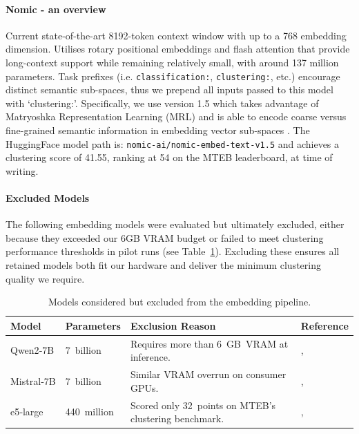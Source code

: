 \documentclass[10pt,oneside]{report}
\renewcommand{\citet}[1]{\citeauthor{#1}, \citeyear{#1}}
\begin{document}
\paragraph{Nomic - an overview}
Current state-of-the-art 8192-token context window with up to a 768 embedding dimension. Utilises rotary positional embeddings and flash attention that provide long-context support while remaining relatively small, with around 137 million parameters. Task prefixes (i.e. \texttt{classification:}, \texttt{clustering:}, etc.) encourage distinct semantic sub-spaces, thus we prepend all inputs passed to this model with `clustering:'. Specifically, we use version 1.5 which takes advantage of Matryoshka Representation Learning (MRL) and is able to encode coarse versus fine-grained semantic information in embedding vector sub-spaces \cite{nussbaum2024nomic, nussbaum2024nomic1.5}. The HuggingFace model path is: \texttt{nomic-ai/nomic-embed-text-v1.5} and achieves a clustering score of 41.55, ranking at 54 on the MTEB leaderboard, at time of writing.

\paragraph{Excluded Models}
The following embedding models were evaluated but ultimately excluded, either because they exceeded our 6GB VRAM budget or failed to meet clustering performance thresholds in pilot runs (see Table~\ref{tab:excludedModels}). Excluding these ensures all retained models both fit our hardware and deliver the minimum clustering quality we require.

\begin{table}[htbp]
    \fontsize{8}{11}\selectfont
    \centering
    \begin{adjustbox}{max width=\textwidth}
        \begin{tabular}{p{1.6cm} p{1.7cm} p{7.3cm} p{2.3cm}}
        \toprule
        \textbf{Model} & \textbf{Parameters} & \textbf{Exclusion Reason} & \textbf{Reference}\\
        \midrule
        Qwen2‑7B   & 7 billion   & Requires more than 6 GB VRAM at inference. & \citet{yang2407qwen2} \\
        Mistral‑7B & 7 billion   & Similar VRAM overrun on consumer GPUs. & \citet{wang2023improving} \\
        e5‑large   & 440 million & Scored only 32 points on MTEB’s clustering  benchmark. & \citet{wang2024multilingual}\\
        \bottomrule
        \end{tabular}
    \end{adjustbox}
    \caption{Models considered but excluded from the embedding pipeline.}
    \label{tab:excludedModels}
\end{table}
\end{document}
